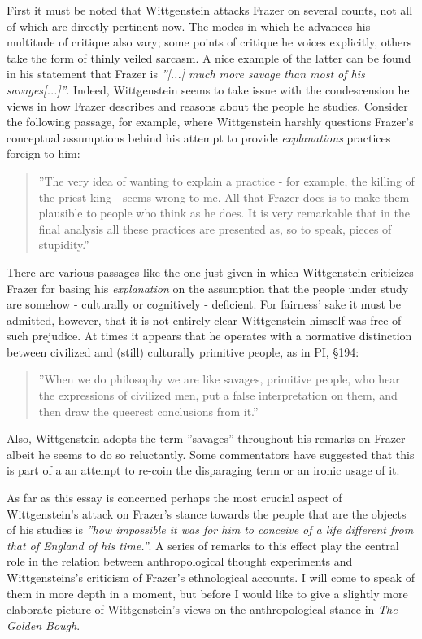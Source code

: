 \documentclass{article}
\begin{document}
First it must be noted that Wittgenstein attacks Frazer on several counts, not all of which are directly pertinent now. The modes in which he advances his multitude of critique also vary; some points of critique he voices explicitly, others take the form of thinly veiled sarcasm. A nice example of the latter can be found in his statement that Frazer is \textit{''[...] much more savage than most of his savages[...]''}.
Indeed, Wittgenstein seems to take issue with the condescension he views in how Frazer describes and reasons about the people he studies. Consider the following passage, for example, where Wittgenstein harshly questions Frazer's conceptual assumptions behind his attempt to provide \textit{explanations} practices foreign to him:
 \begin{quote}
 ''The very idea of wanting to explain a practice - for example, the killing of the priest-king - seems wrong to me. All that Frazer does is to make them plausible to people who think as he does. It is very remarkable that in the final analysis all these practices are presented as, so to speak, pieces of stupidity.''%
 \end{quote}
 There are various passages like the one just given in which Wittgenstein criticizes Frazer for basing his \textit{explanation} on the assumption that the people under study are somehow - culturally or cognitively - deficient. For fairness' sake it must be admitted, however, that it is not entirely clear Wittgenstein himself was free of such prejudice. At times it appears that he operates with a normative distinction between civilized and (still) culturally primitive people, as in PI, §194:
\begin{quote}
''When we do philosophy we are like savages, primitive people, who hear the expressions of civilized men, put a false interpretation on them, and then draw the queerest conclusions from it.''
\end{quote}
 Also, Wittgenstein adopts the term ''savages'' throughout his remarks on Frazer - albeit he seems to do so reluctantly. Some commentators have suggested that this is part of a an attempt to re-coin the disparaging term or an ironic usage of it. %

As far as this essay is concerned perhaps the most crucial aspect of Wittgenstein's attack on Frazer's stance towards the people that are the objects of his studies is \textit{''how impossible it was for him to conceive of a life different from that of England of his time.''}. A series of remarks to this effect play the central role in the relation between anthropological thought experiments and Wittgensteins's criticism of Frazer's ethnological accounts. I will come to speak of them in more depth in a moment, but before I would like to give a slightly more elaborate picture of Wittgenstein's views on the anthropological stance in \textit{The Golden Bough}.
 
\end{document}

